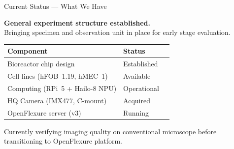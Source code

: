 \documentclass[aspectratio=169,11pt]{beamer}
\begin{document}
\begin{frame}{Current Status --- What We Have}

  \textbf{General experiment structure established.}\\
  Bringing specimen and observation unit in place for early stage evaluation.

  \vspace{0.5em}

  \begin{tabular}{@{}lll@{}}
    \toprule
    \textbf{Component} & \textbf{Status} \\
    \midrule
    Bioreactor chip design        & Established \\
    Cell lines (hFOB~1.19, hMEC~1) & Available \\
    Computing (RPi~5 + Hailo-8 NPU) & Operational \\
    HQ Camera (IMX477, C-mount)   & Acquired \\
    OpenFlexure server (v3)       & Running \\
    \bottomrule
  \end{tabular}

  \vspace{0.8em}
  \small
  Currently verifying imaging quality on conventional microscope before transitioning to OpenFlexure platform.

\end{frame}
\end{document}
